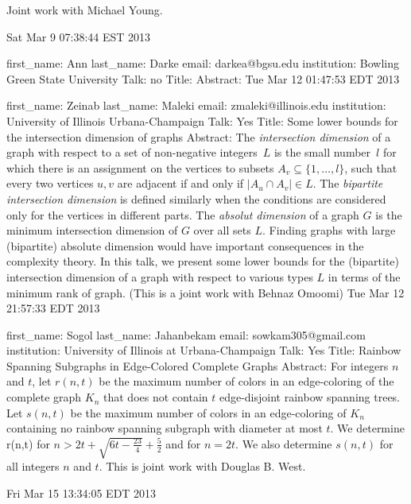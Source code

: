 \documentclass{article}
\begin{document}
Joint work with Michael Young.



Sat Mar  9 07:38:44 EST 2013

first_name: Ann
last_name: Darke
email: darkea@bgsu.edu
institution: Bowling Green State University
Talk: no
Title:
Abstract:
Tue Mar 12 01:47:53 EDT 2013

first_name: Zeinab
last_name: Maleki
email: zmaleki@illinois.edu
institution: University of Illinois Urbana-Champaign
Talk: Yes
Title: Some lower bounds for the intersection dimension of graphs
Abstract: The {\it intersection dimension} of a graph with respect to a set of non-negative integers~$L$ is the small number~$l$ for which there is an assignment on the vertices to subsets $A_v \subseteq \{1,\dots, l\}$, such that every two vertices $u,v$ are adjacent if and only if $|A_u \cap A_v|\in L$.
The {\it bipartite intersection dimension} is defined similarly when the conditions are considered only for the vertices in different parts. The {\it absolut dimension} of a graph $G$ is the minimum intersection dimension of $G$ over all sets $L$. Finding graphs with large (bipartite) absolute dimension would have important consequences in the complexity theory.
In this talk, we present some lower bounds for the (bipartite) intersection dimension of a graph with respect to various types $L$ in terms of the minimum rank of graph.
(This is a joint work with Behnaz Omoomi)
Tue Mar 12 21:57:33 EDT 2013

first_name: Sogol
last_name: Jahanbekam
email: sowkam305@gmail.com
institution: University of Illinois at Urbana-Champaign
Talk: Yes
Title: Rainbow Spanning Subgraphs in Edge-Colored Complete Graphs
Abstract: For integers $n$ and $t$, let $r(n,t)$ be the maximum number of colors in an
edge-coloring of the complete graph $K_n$ that does not contain $t$
edge-disjoint rainbow spanning trees.  Let $s(n,t)$ be the maximum number of colors in an edge-coloring of $K_n$ containing no rainbow spanning subgraph with diameter at most $t$.  We determine r(n,t) for
$n>2t+\sqrt{6t-\frac{23}{4}}+\frac52$ and for $n=2t$. We also determine $s(n,t)$ for all integers $n$ and $t$.
This is joint work with Douglas B. West.

Fri Mar 15 13:34:05 EDT 2013
\end{document}
